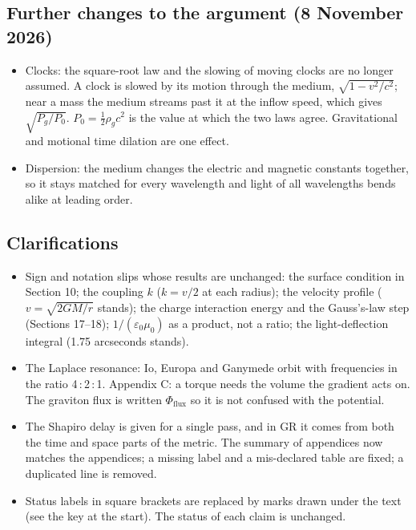\documentclass[12pt, a4paper]{article}
\begin{document}
\subsection*{Further changes to the argument (8 November 2026)}
\begin{itemize}
  \item Clocks: the square-root law and the slowing of moving clocks are no longer assumed. A clock is slowed by its motion through the medium, $\sqrt{1-v^2/c^2}$; near a mass the medium streams past it at the inflow speed, which gives $\sqrt{P_g/P_0}$. $P_0=\tfrac12\rho_g c^2$ is the value at which the two laws agree. Gravitational and motional time dilation are one effect.
  \item Dispersion: the medium changes the electric and magnetic constants together, so it stays matched for every wavelength and light of all wavelengths bends alike at leading order.
\end{itemize}

\subsection*{Clarifications}
\begin{itemize}
  \item Sign and notation slips whose results are unchanged: the surface condition in Section 10; the coupling \(k\) (\(k = v/2\) at each radius); the velocity profile (\(v = \sqrt{2GM/r}\) stands); the charge interaction energy and the Gauss's-law step (Sections 17--18); \(1/(\varepsilon_0\mu_0)\) as a product, not a ratio; the light-deflection integral (1.75 arcseconds stands).
  \item The Laplace resonance: Io, Europa and Ganymede orbit with frequencies in the ratio 4\,:\,2\,:\,1. Appendix C: a torque needs the volume the gradient acts on. The graviton flux is written \(\Phi_{\text{flux}}\) so it is not confused with the potential.
  \item The Shapiro delay is given for a single pass, and in GR it comes from both the time and space parts of the metric. The summary of appendices now matches the appendices; a missing label and a mis-declared table are fixed; a duplicated line is removed.
  \item Status labels in square brackets are replaced by marks drawn under the text (see the key at the start). The status of each claim is unchanged.
\end{itemize}
\end{document}
